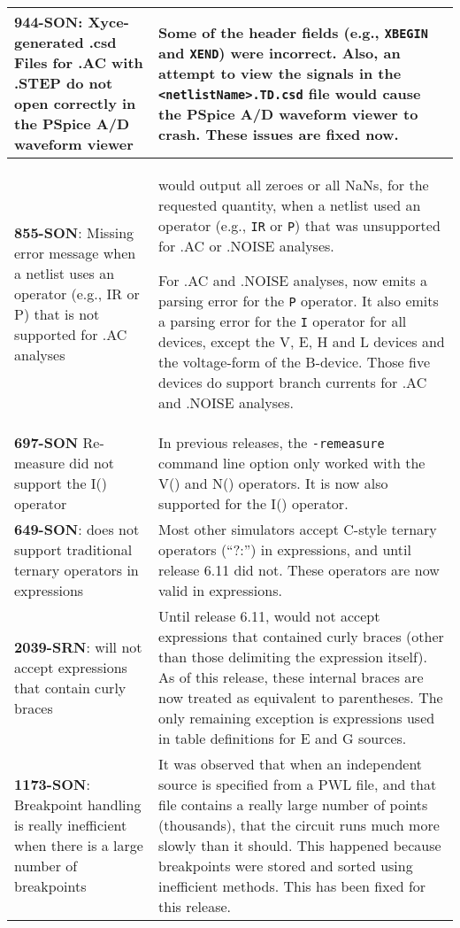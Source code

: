 {\begin{longtable}[h] {>{\raggedright\small}m{2in}|>{\raggedright\let\\\tabularnewline\small}m{3.5in}}
\textbf{944-SON}: Xyce-generated .csd Files for .AC with .STEP do not
open correctly in the PSpice A/D waveform viewer & Some of the header
fields (e.g., \texttt{XBEGIN} and \texttt{XEND}) were incorrect.
Also, an attempt to view the signals in
the \texttt{<netlistName>.TD.csd} file would cause the PSpice A/D
waveform viewer to crash.  These issues are fixed now.
\\ \hline

\textbf{855-SON}: Missing error message when a netlist uses an operator (e.g.,
IR or P) that is not supported for .AC analyses &  \Xyce{} would output all
zeroes or all NaNs, for the requested quantity, when a netlist used an operator (e.g.,
\texttt{IR} or \texttt{P}) that was unsupported for .AC or .NOISE analyses.

For .AC and .NOISE analyses,  \Xyce{} now emits a parsing error for the \texttt{P}
operator.  It also emits a parsing error for the \texttt{I} operator for all devices,
except the V, E, H and L devices and the voltage-form of the B-device.  Those five
devices do support branch currents for .AC and .NOISE analyses. \\ \hline

\textbf{697-SON} Re-measure did not support the  I() operator & In previous \Xyce{}
releases, the \texttt{-remeasure} command line option only worked with
the V() and N() operators.  It is now also supported for the I()
operator. \\ \hline

\textbf{649-SON}: \Xyce{} does not support traditional ternary operators in expressions &
 Most other simulators accept C-style ternary operators (``?:'') in
 expressions, and until release 6.11 \Xyce{} did not.  These operators
 are now valid in \Xyce{} expressions. \\ \hline

\textbf{2039-SRN}: \Xyce{} will not accept expressions that contain curly braces &
  Until release 6.11, \Xyce{} would not accept expressions that
  contained curly braces (other than those delimiting the expression
  itself).  As of this release, these internal braces are now treated
  as equivalent to parentheses.  The only remaining exception is expressions
  used in table definitions for E and G sources.\\ \hline


\textbf{1173-SON}: Breakpoint handling is really inefficient when there is a large number of breakpoints &
It was observed that when an independent source is specified from a
PWL file, and that file contains a really large number of points
(thousands), that the circuit runs much more slowly than it should.
This happened because breakpoints were stored and sorted using
inefficient methods.  This has been fixed for this release.  \\ \hline


\end{longtable}}
